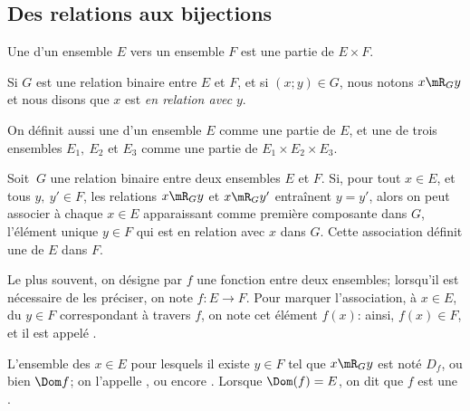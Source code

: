 \subsection{Des relations aux bijections}
\label{SUBooRelFctBijections}

\begin{definition}        \label{DEFooRFVTooUUuFuE}
	Une  d'un ensemble \( E\) vers un ensemble \( F\) est une partie de \( E\times F\).

	Si \( G\) est une relation binaire entre \( E\) et \( F\), et si \( (x; y) \in G \), nous notons \( x\mR_G y\) et nous disons que \( x\) est \emph{en relation avec} \( y\).

	On définit aussi une  d'un ensemble \( E \) comme une partie de \( E \), et une  de trois ensembles \( E_1,\ E_2 \) et \( E_3 \) comme une partie de \( E_1 \times E_2 \times E_3 \).
\end{definition}

\begin{definition}\label{DefooApplicFct}
	Soit \(\ G\) une relation binaire entre deux ensembles \(E\) et \( F\). Si, pour tout \(x \in E\), et tous \(y,\ y' \in F\), les relations \(x\mR_G y\) et \(x\mR_G y'\) entraînent \( y = y'\), alors on peut associer à chaque \( x \in E\) apparaissant comme première composante dans \( G \), l'élément unique \(y \in F\) qui est en relation avec \(x\) dans \(G\). Cette association définit une  de \(E\) dans \(F\).

	Le plus souvent, on désigne par \(f \) une fonction entre deux ensembles; lorsqu'il est nécessaire de les préciser, on note \( f: E \to F \). Pour marquer l'association, à \(x \in E \), du \(y \in F\) correspondant à travers \( f \), on note cet élément \( f(x) \): ainsi, \( f(x) \in F \), et il est appelé .

	L'ensemble des \( x \in E \) pour lesquels il existe \( y \in F\) tel que \(x\mR_G y\) est noté \(D_f \), ou bien \( \Dom f \); on l'appelle , ou encore . Lorsque \(\Dom(f) = E\), on dit que \( f \) est une .
\end{definition}

